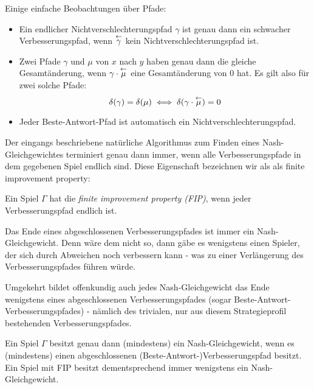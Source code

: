 \begin{beob}\label{beob:Pfade}
	Einige einfache Beobachtungen über Pfade:
	\begin{itemize}
		\item Ein endlicher Nichtverschlechterungspfad $\gamma$ ist genau dann ein schwacher Verbesserungspfad, wenn $\overset{\leftarrow}{\gamma}$ kein Nichtverschlechterungspfad ist. 
		
		\item Zwei Pfade $\gamma$ und $\mu$ von $x$ nach $y$ haben genau dann die gleiche Gesamtänderung, wenn $\gamma\cdot\overset{\leftarrow}{\mu}$ eine Gesamtänderung von $0$ hat. Es gilt also für zwei solche Pfade: 
		\[\delta(\gamma) = \delta(\mu) \iff \delta(\gamma\cdot\overset{\leftarrow}{\mu})=0 \]
		
		\item Jeder Beste-Antwort-Pfad ist automatisch ein Nichtverschlechterungspfad.
	\end{itemize}
\end{beob}

Der eingangs beschriebene natürliche Algorithmus zum Finden eines Nash-Gleichgewichtes terminiert genau dann immer, wenn alle Verbesserungspfade in dem gegebenen Spiel endlich sind. Diese Eigenschaft bezeichnen wir als als finite improvement property:

\begin{defn}
	Ein Spiel $\Gamma$ hat die \emph{finite improvement property (FIP)}, wenn jeder Verbesserungspfad endlich ist.
\end{defn}

\begin{beob}\label{beob:VerbPfadeundNGe}
	Das Ende eines abgeschlossenen Verbesserungspfades ist immer ein Nash-Gleichgewicht. Denn wäre dem nicht so, dann gäbe es wenigstens einen Spieler, der sich durch Abweichen noch verbessern kann - was zu einer Verlängerung des Verbesserungspfades führen würde. 
		
	Umgekehrt bildet offenkundig auch jedes Nash-Gleichgewicht das Ende wenigstens eines abgeschlossenen Verbesserungspfades (sogar Beste-Antwort-Verbesserungspfades) - nämlich des trivialen, nur aus diesem Strategieprofil bestehenden Verbesserungspfades.
\end{beob}

\begin{beob}\label{kor:ExVerbPfadExNG}
	Ein Spiel $\Gamma$ besitzt genau dann (mindestens) ein Nash-Gleichgewicht, wenn es (mindestens) einen abgeschlossenen (Beste-Antwort-)Verbesserungspfad besitzt. Ein Spiel mit FIP besitzt dementsprechend immer wenigstens ein Nash-Gleichgewicht.
\end{beob}

